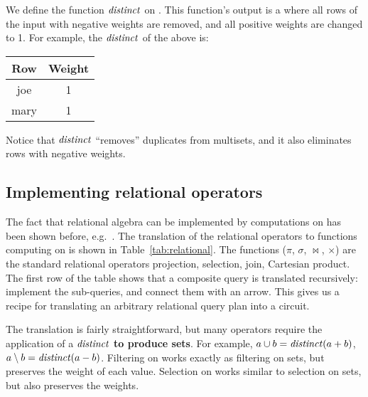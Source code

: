 
We define the function $\mathit{distinct}$ on \zrs. This function's output is
a \zr where all rows of the input with negative weights are removed,
and all positive weights are changed to 1.  For example, the
$\mathit{distinct}$ of the above \zr is:
%
\begin{center}
\begin{tabular}{|c|c|}\hline
  Row & Weight \\ \hline
  joe & 1 \\
  mary & 1 \\ \hline
\end{tabular}
\end{center}

Notice that $\mathit{distinct}$ ``removes'' duplicates from multisets, and it also eliminates
rows with negative weights.

\subsection{Implementing relational operators}\label{sec:relational-operators}

The fact that relational algebra can be implemented by computations on
\zrs has been shown before, e.g.~\cite{green-pods07}.  The translation
of the relational operators to functions computing on \zrs is shown in
Table~\ref{tab:relational}.  The functions ($\pi$, $\sigma$,
$\bowtie$, $\times$) are the standard relational operators projection,
selection, join, Cartesian product.  The first row of the table shows
that a composite query is translated recursively: implement the
sub-queries, and connect them with an arrow.  This gives us a recipe
for translating an arbitrary relational query plan into a circuit.

The translation is fairly straightforward, but many operators require
the application of a $\mathit{distinct}$ \textbf{to produce sets}.  For
example, $a \cup b = \mathit{distinct}(a + b)$, $a \setminus b = \mathit{distinct}(a -
b)$.  Filtering on \zrs works exactly as filtering on sets, but
preserves the weight of each value.  Selection on \zrs works similar
to selection on sets, but also preserves the weights.

